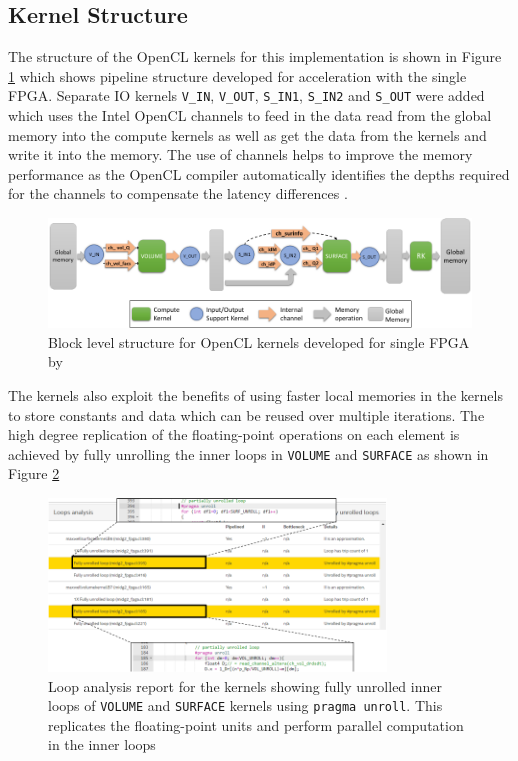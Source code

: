 \subsection{Kernel Structure}

The structure of the OpenCL kernels for this implementation is shown in Figure \ref{fig:singlefpga_kernstruc}
which shows pipeline structure developed for acceleration with the single FPGA.
Separate IO kernels \texttt{V\_IN}, \texttt{V\_OUT}, \texttt{S\_IN1}, \texttt{S\_IN2}
and \texttt{S\_OUT} were added which uses the Intel OpenCL channels to feed in the data
read from the global memory into the compute kernels as well as get the data from the
kernels and write it into the memory. The use of channels helps to improve the
memory performance as the OpenCL compiler automatically identifies the depths
required for the channels to compensate the latency differences \cite{kenter_opencl-based_2018}.
\begin{figure}[ht]%
    \centering
    \includegraphics[width=1.0\textwidth]{images/nb_kernstruc}
    \caption{Block level structure for OpenCL kernels developed for single FPGA by \textcite{kenter_opencl-based_2018}}
    \label{fig:singlefpga_kernstruc}
\end{figure}

The kernels also exploit the benefits of using faster local memories in the kernels
to store constants and data which can be reused over multiple iterations. The high
degree replication of the floating-point operations on each element is achieved
by fully unrolling the inner loops in \texttt{VOLUME} and \texttt{SURFACE} as shown
in Figure \ref{fig:loop_report}
\begin{figure}[ht]%
    \centering
    \includegraphics[width=0.8\textwidth]{images/loop_report}
    \caption{Loop analysis report for the kernels showing fully unrolled inner
    loops of \texttt{VOLUME} and \texttt{SURFACE} kernels using \texttt{pragma unroll}.
    This replicates the floating-point units and perform parallel computation in
    the inner loops}
    \label{fig:loop_report}
\end{figure}

